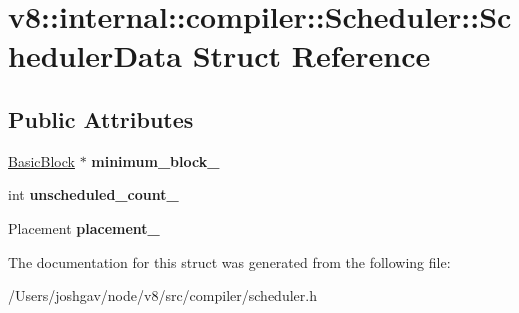 \hypertarget{structv8_1_1internal_1_1compiler_1_1_scheduler_1_1_scheduler_data}{}\section{v8\+:\+:internal\+:\+:compiler\+:\+:Scheduler\+:\+:Scheduler\+Data Struct Reference}
\label{structv8_1_1internal_1_1compiler_1_1_scheduler_1_1_scheduler_data}
\subsection*{Public Attributes}
\begin{DoxyCompactItemize}
\item 
\hyperlink{classv8_1_1internal_1_1compiler_1_1_basic_block}{Basic\+Block} $\ast$ {\bfseries minimum\+\_\+block\+\_\+}\hypertarget{structv8_1_1internal_1_1compiler_1_1_scheduler_1_1_scheduler_data_a76a8d2aefea037d35a7028249c394c33}{}\label{structv8_1_1internal_1_1compiler_1_1_scheduler_1_1_scheduler_data_a76a8d2aefea037d35a7028249c394c33}

\item 
int {\bfseries unscheduled\+\_\+count\+\_\+}\hypertarget{structv8_1_1internal_1_1compiler_1_1_scheduler_1_1_scheduler_data_aad1f6253f090990b3a8e556298ee0263}{}\label{structv8_1_1internal_1_1compiler_1_1_scheduler_1_1_scheduler_data_aad1f6253f090990b3a8e556298ee0263}

\item 
Placement {\bfseries placement\+\_\+}\hypertarget{structv8_1_1internal_1_1compiler_1_1_scheduler_1_1_scheduler_data_a5acb88e8b83bcab82be33f653635944a}{}\label{structv8_1_1internal_1_1compiler_1_1_scheduler_1_1_scheduler_data_a5acb88e8b83bcab82be33f653635944a}

\end{DoxyCompactItemize}


The documentation for this struct was generated from the following file\+:\begin{DoxyCompactItemize}
\item 
/\+Users/joshgav/node/v8/src/compiler/scheduler.\+h\end{DoxyCompactItemize}
